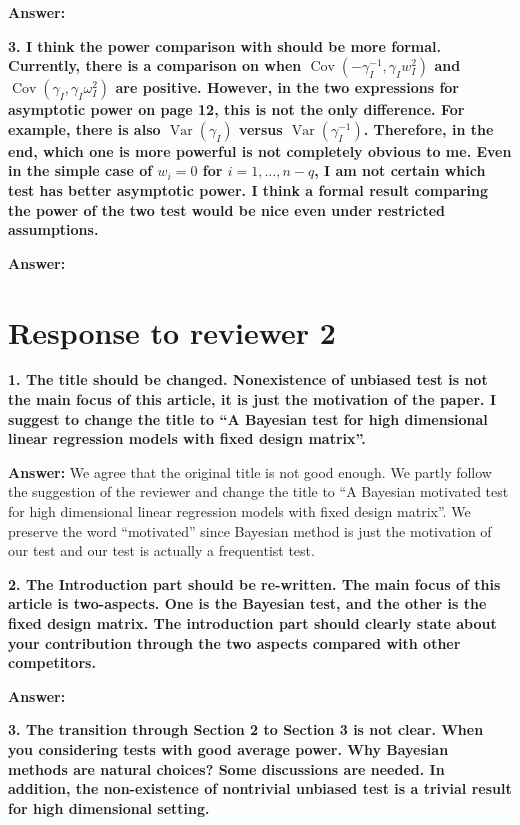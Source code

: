 \documentclass[11pt]{article}
\DeclareMathOperator{\myVar}{Var}
\DeclareMathOperator{\myCov}{Cov}
\theoremstyle{plain}
\theoremstyle{definition}
\theoremstyle{remark}
\begin{document}
\textbf{Answer:}

\textbf{
    3.
    I think the power comparison with \cite{Goeman2006} should be more
    formal. Currently, there is a comparison on when $\myCov(-\gamma_I^{-1}, \gamma_I w_I^2)$ and $\myCov(\gamma_I, \gamma_I \omega_I^2)$ are positive.
    However, in the two expressions for asymptotic power on page 12, this is not the only difference.
    For example, there is also $\myVar (\gamma_I)$ versus $\myVar(\gamma_I^{-1})$.
    Therefore, in the end, which one is more powerful is not completely obvious to me.
    Even in the simple case of $w_i = 0$ for $i = 1, ..., n−q$, I am not certain which test has better asymptotic power.
I think a formal result comparing the power of the two test would be nice
even under restricted assumptions.
}

\textbf{Answer:}


\section{Response to reviewer 2}

\textbf{
    1. The title should be changed. Nonexistence of unbiased test is not the main focus of this article, it is just the motivation of the paper. I suggest to change the title to ``A Bayesian test for high dimensional linear regression models with fixed design matrix''.
}

\textbf{Answer:}
We agree that the original title is not good enough.
We partly follow the suggestion of the reviewer and change the title to ``A Bayesian motivated test for high dimensional linear regression models with fixed design matrix''.
We preserve the word ``motivated'' since Bayesian method is just the motivation of our test and our test is actually a frequentist test.

\textbf{
    2. The Introduction part should be re-written.
    The main focus of this article is two-aspects.
    One is the Bayesian test, and the other is the fixed design matrix. 
    The introduction part should clearly state about your contribution through the two aspects compared with other competitors.
}

\textbf{Answer:}

\textbf{
    3. The transition through Section 2 to Section 3 is not clear.
    When you considering tests with good average power.
    Why Bayesian methods are natural choices?
    Some discussions are needed. In addition, the non-existence of nontrivial unbiased test is a trivial result for high dimensional setting.
}
\end{document}

